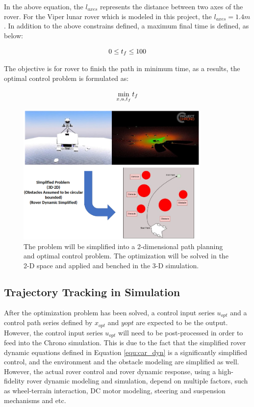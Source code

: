 \documentclass{article}
\begin{document}
In the above equation, the $l_{axes}$ represents the distance between two axes of the rover. For the Viper lunar rover which is modeled in this project, the $l_{axes} = 1.4 m$. In addition to the above constrains defined, a maximum final time is defined, as below:

\begin{equation}
	\label{equ:time_cons}
	0 \leq t_{f} \leq 100 \\
\end{equation}

The objective is for rover to finish the path in minimum time, as a results, the optimal control problem is formulated as:

\begin{equation}
	\label{equ:car_opt}
	\min_{x,u,t_{f}}t_{f}\\
\end{equation}


\begin{figure}
\centering
    \label{fig:rover_path}
    \includegraphics[width=0.85\textwidth]{Images/rover_path.png}
    \caption{The problem will be simplified into a 2-dimensional path planning and optimal control problem. The optimization will be solved in the 2-D space and applied and benched in the 3-D simulation.}
\end{figure}

\subsection{Trajectory Tracking in Simulation}

After the optimization problem has been solved, a control input series \(u_{opt}\) and a control path series defined by \(x_{opt}\) and \(y{opt}\) are expected to be the output. However, the control input series \(u_{opt}\) will need to be post-processed in order to feed into the Chrono simulation. This is due to the fact that the simplified rover dynamic equations defined in Equation \ref{equ:car_dyn} is a significantly simplified control, and the environment and the obstacle modeling are simplified as well. However, the actual rover control and rover dynamic response, using a high-fidelity rover dynamic modeling and simulation, depend on multiple factors, such as wheel-terrain interaction, DC motor modeling, steering and suspension mechanisms and etc. 
\end{document}
